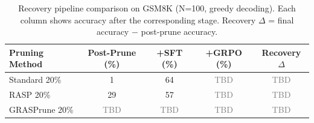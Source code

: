 \begin{table}[t]
\centering
\caption{Recovery pipeline comparison on GSM8K (N=100, greedy decoding). Each column shows accuracy after the corresponding stage. Recovery $\Delta$ = final accuracy $-$ post-prune accuracy.}
\label{tab:recovery}
\begin{tabular}{l S[table-format=2.0] S[table-format=2.0] S[table-format=2.0] S[table-format=3.0]}
\toprule
{Pruning Method} & {Post-Prune (\%)} & {+SFT (\%)} & {+GRPO (\%)} & {Recovery $\Delta$} \\
\midrule
Standard 20\%  & 1  & 64 & \textcolor{gray}{TBD} & \textcolor{gray}{TBD} \\
RASP 20\%      & 29 & 57 & \textcolor{gray}{TBD} & \textcolor{gray}{TBD} \\
GRASPrune 20\% & \textcolor{gray}{TBD} & \textcolor{gray}{TBD} & \textcolor{gray}{TBD} & \textcolor{gray}{TBD} \\
\bottomrule
\end{tabular}
\end{table}
